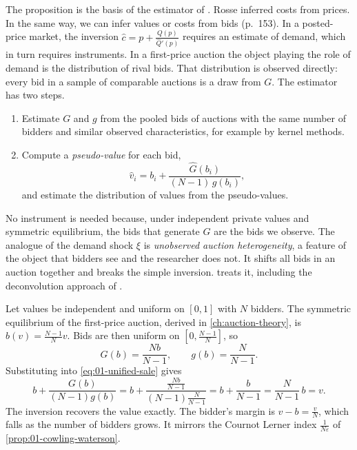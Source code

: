 The proposition is the basis of the estimator of \citet{GuerrePerrigneVuong2000}. Rosse inferred costs from
prices. In the same way, we can infer values or costs from bids (p.~153). In a posted-price market, the
inversion $\hat c = p + \frac{Q(p)}{\hat Q'(p)}$ requires an estimate of demand, which in turn requires
instruments. In a first-price auction the object playing the role of demand is the distribution of rival bids.
That distribution is observed directly: every bid in a sample of comparable auctions is a draw from $G$. The
estimator has two steps.
\begin{enumerate}[label=(\arabic*)]
  \item Estimate $G$ and $g$ from the pooled bids of auctions with the same number of bidders and similar
        observed characteristics, for example by kernel methods.
  \item Compute a \emph{pseudo-value} for each bid,
        \begin{equation}\label{eq:01-pseudo-values}
          \hat v_i = b_i + \frac{\hat G(b_i)}{(N - 1)\,\hat g(b_i)},
        \end{equation}
        and estimate the distribution of values from the pseudo-values.
\end{enumerate}
No instrument is needed because, under independent private values and symmetric equilibrium, the bids that
generate $G$ are the bids we observe. The analogue of the demand shock $\xi$ is \emph{unobserved auction
heterogeneity}, a feature of the object that bidders see and the researcher does not. It shifts all bids in an
auction together and breaks the simple inversion.  treats it, including the
deconvolution approach of \citet{Krasnokutskaya2011}.

\begin{example}\label{ex:01-gpv-uniform}
Let values be independent and uniform on $[0, 1]$ with $N$ bidders. The symmetric equilibrium of the
first-price auction, derived in \cref{ch:auction-theory}, is $b(v) = \frac{N - 1}{N}v$. Bids are then uniform
on $\left[0, \frac{N - 1}{N}\right]$, so
\[
  G(b) = \frac{N b}{N - 1}, \qquad g(b) = \frac{N}{N - 1} .
\]
Substituting into \eqref{eq:01-unified-sale} gives
\[
  b + \frac{G(b)}{(N - 1)g(b)}
  = b + \frac{\frac{Nb}{N - 1}}{(N - 1)\frac{N}{N - 1}}
  = b + \frac{b}{N - 1}
  = \frac{N}{N - 1}\, b = v .
\]
The inversion recovers the value exactly. The bidder's margin is $v - b = \frac{v}{N}$, which falls as the
number of bidders grows. It mirrors the Cournot Lerner index $\frac{1}{N\varepsilon}$ of
\cref{prop:01-cowling-waterson}.
\end{example}

